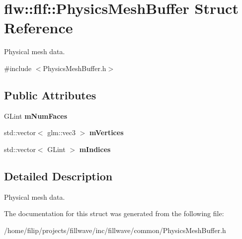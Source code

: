 \hypertarget{structflw_1_1flf_1_1PhysicsMeshBuffer}{}\section{flw\+:\+:flf\+:\+:Physics\+Mesh\+Buffer Struct Reference}
\label{structflw_1_1flf_1_1PhysicsMeshBuffer}


Physical mesh data.  




{\ttfamily \#include $<$Physics\+Mesh\+Buffer.\+h$>$}

\subsection*{Public Attributes}
\begin{DoxyCompactItemize}
\item 
\mbox{\label{structflw_1_1flf_1_1PhysicsMeshBuffer_a4e3361cdc8b56c4f0f72720a2d92a5e7}} 
G\+Lint {\bfseries m\+Num\+Faces}
\item 
\mbox{\label{structflw_1_1flf_1_1PhysicsMeshBuffer_af339e5c24ece37c2dda8fd416f9ceed2}} 
std\+::vector$<$ glm\+::vec3 $>$ {\bfseries m\+Vertices}
\item 
\mbox{\label{structflw_1_1flf_1_1PhysicsMeshBuffer_a19cbfc43d96366e8cca09dcbc27c586b}} 
std\+::vector$<$ G\+Lint $>$ {\bfseries m\+Indices}
\end{DoxyCompactItemize}


\subsection{Detailed Description}
Physical mesh data. 

The documentation for this struct was generated from the following file\+:\begin{DoxyCompactItemize}
\item 
/home/filip/projects/fillwave/inc/fillwave/common/Physics\+Mesh\+Buffer.\+h\end{DoxyCompactItemize}
